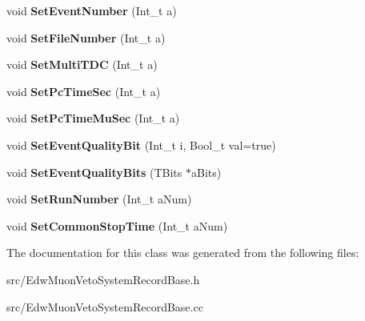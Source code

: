 \begin{DoxyCompactItemize}
\item 
\hypertarget{class_edw_muon_veto_system_record_base_a4a0390e1364c19a7f3de2d35bcea9738}{
void {\bfseries SetEventNumber} (Int\_\-t a)}
\label{class_edw_muon_veto_system_record_base_a4a0390e1364c19a7f3de2d35bcea9738}

\item 
\hypertarget{class_edw_muon_veto_system_record_base_adb7773772ef5b7183cf80a30f9efe0c3}{
void {\bfseries SetFileNumber} (Int\_\-t a)}
\label{class_edw_muon_veto_system_record_base_adb7773772ef5b7183cf80a30f9efe0c3}

\item 
\hypertarget{class_edw_muon_veto_system_record_base_aa76f5bfac39a1572af94e2b3eea96eff}{
void {\bfseries SetMultiTDC} (Int\_\-t a)}
\label{class_edw_muon_veto_system_record_base_aa76f5bfac39a1572af94e2b3eea96eff}

\item 
\hypertarget{class_edw_muon_veto_system_record_base_ab2d5f758911e5d3e7fec5d2e3a14712f}{
void {\bfseries SetPcTimeSec} (Int\_\-t a)}
\label{class_edw_muon_veto_system_record_base_ab2d5f758911e5d3e7fec5d2e3a14712f}

\item 
\hypertarget{class_edw_muon_veto_system_record_base_aaee030e896baa00f95eae87ae96f937f}{
void {\bfseries SetPcTimeMuSec} (Int\_\-t a)}
\label{class_edw_muon_veto_system_record_base_aaee030e896baa00f95eae87ae96f937f}

\item 
\hypertarget{class_edw_muon_veto_system_record_base_ad881f13b5f714c6fbc4e906e2d129670}{
void {\bfseries SetEventQualityBit} (Int\_\-t i, Bool\_\-t val=true)}
\label{class_edw_muon_veto_system_record_base_ad881f13b5f714c6fbc4e906e2d129670}

\item 
\hypertarget{class_edw_muon_veto_system_record_base_af3d28b0e739db93de0012ac3f74f54c5}{
void {\bfseries SetEventQualityBits} (TBits $\ast$aBits)}
\label{class_edw_muon_veto_system_record_base_af3d28b0e739db93de0012ac3f74f54c5}

\item 
\hypertarget{class_edw_muon_veto_system_record_base_a3e520f66708c5220b9660cae56024387}{
void {\bfseries SetRunNumber} (Int\_\-t aNum)}
\label{class_edw_muon_veto_system_record_base_a3e520f66708c5220b9660cae56024387}

\item 
\hypertarget{class_edw_muon_veto_system_record_base_aa5973efc5d7b6a138f9abef966155a3f}{
void {\bfseries SetCommonStopTime} (Int\_\-t aNum)}
\label{class_edw_muon_veto_system_record_base_aa5973efc5d7b6a138f9abef966155a3f}

\end{DoxyCompactItemize}


The documentation for this class was generated from the following files:\begin{DoxyCompactItemize}
\item 
src/EdwMuonVetoSystemRecordBase.h\item 
src/EdwMuonVetoSystemRecordBase.cc\end{DoxyCompactItemize}
